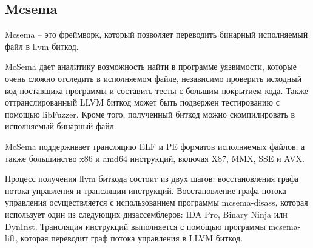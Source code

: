 \subsection{Mcsema}
Mcsema\cite{Mcsema} -- это фреймворк, который позволяет переводить бинарный исполняемый файл в llvm биткод.

McSema дает аналитику возможность найти в программе уязвимости, которые очень сложно отследить в исполняемом файле, независимо проверить исходный код поставщика программы и составить тесты с большим покрытием кода. Также оттранслированный LLVM биткод может быть подвержен тестированию с помощью libFuzzer\cite{libFuzzer}. Кроме того, полученный биткод можно скомпилировать в исполняемый бинарный файл.

McSema поддерживает трансляцию ELF и PE форматов исполняемых файлов, а также большинство x86 и amd64 инструкций, включая X87, MMX, SSE и AVX.

Процесс получения llvm биткода состоит из двух шагов: восстановления графа потока управления и трансляции инструкций. Восстановление графа потока управления осуществляется с использованием программы mcsema-disass, которая использует один из следующих дизассемблеров: IDA Pro, Binary Ninja или DynInst. Трансляция инструкций выполняется с помощью программы mcsema-lift, которая переводит граф потока управления в LLVM биткод.
